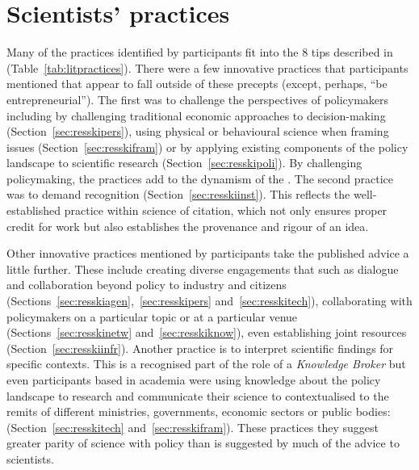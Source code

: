 \section{Scientists' practices}\label{sec:disstrategies}

Many of the practices identified by participants fit into the 8 tips described in \textcite{OliverC2019} (Table~\ref{tab:litpractices}). There were a few innovative practices that participants mentioned that appear to fall outside of these precepts (except, perhaps, ``be entrepreneurial''). The first was to challenge the perspectives of policymakers including by challenging traditional economic approaches to decision-making (Section~\ref{sec:resskipers}), using physical or behavioural science when framing issues (Section~\ref{sec:resskifram}) or by applying existing components of the policy landscape to scientific research (Section~\ref{sec:resskipoli}). By challenging policymaking, the practices add to the dynamism of the \SPI. The second practice was to demand recognition (Section~\ref{sec:resskiinst}). This reflects the well-established practice within science of citation, which not only ensures proper credit for work but also establishes the provenance and rigour of an idea.

Other innovative practices mentioned by participants take the published advice a little further. These include creating diverse engagements that such as dialogue and collaboration beyond policy to industry and citizens (Sections~\ref{sec:resskiagen},~\ref{sec:resskipers} and~\ref{sec:resskitech}), collaborating with policymakers on a particular topic or at a particular venue (Sections~\ref{sec:resskinetw} and~\ref{sec:resskiknow}), even establishing joint resources (Section~\ref{sec:resskiinfr}). Another practice is to interpret scientific findings for specific contexts. This is a recognised part of the role of a \emph{Knowledge Broker} but even participants based in academia were using knowledge about the policy landscape to research and communicate their science to contextualised to the remits of different ministries, governments, economic sectors or public bodies:  (Section~\ref{sec:resskitech} and~\ref{sec:resskifram}). These practices they suggest greater parity of science with policy than is suggested by much of the advice to scientists. 

